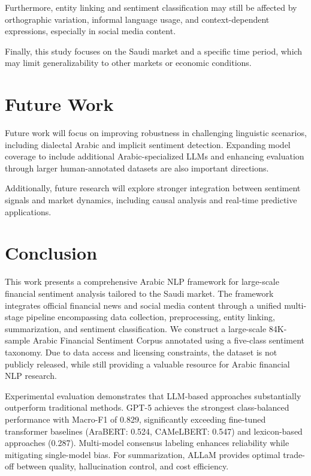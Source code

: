 \documentclass[10pt,a4paper]{article}
\begin{document}
Furthermore, entity linking and sentiment classification may still be affected by orthographic variation, informal language usage, and context-dependent expressions, especially in social media content.

Finally, this study focuses on the Saudi market and a specific time period, which may limit generalizability to other markets or economic conditions.

\section{Future Work}
Future work will focus on improving robustness in challenging linguistic scenarios, including dialectal Arabic and implicit sentiment detection. Expanding model coverage to include additional Arabic-specialized LLMs and enhancing evaluation through larger human-annotated datasets are also important directions.

Additionally, future research will explore stronger integration between sentiment signals and market dynamics, including causal analysis and real-time predictive applications.


\section{Conclusion}
\label{sec:conclusion}

This work presents a comprehensive Arabic NLP framework for large-scale financial sentiment analysis tailored to the Saudi market. The framework integrates official financial news and social media content through a unified multi-stage pipeline encompassing data collection, preprocessing, entity linking, summarization, and sentiment classification. We construct a large-scale 84K-sample Arabic Financial Sentiment Corpus annotated using a five-class sentiment taxonomy. Due to data access and licensing constraints, the dataset is not publicly released, while still providing a valuable resource for Arabic financial NLP research.

Experimental evaluation demonstrates that LLM-based approaches substantially outperform traditional methods. GPT-5 achieves the strongest class-balanced performance with Macro-F1 of 0.829, significantly exceeding fine-tuned transformer baselines (AraBERT: 0.524, CAMeLBERT: 0.547) and lexicon-based approaches (0.287). Multi-model consensus labeling enhances reliability while mitigating single-model bias. For summarization, ALLaM provides optimal trade-off between quality, hallucination control, and cost efficiency.
\end{document}
